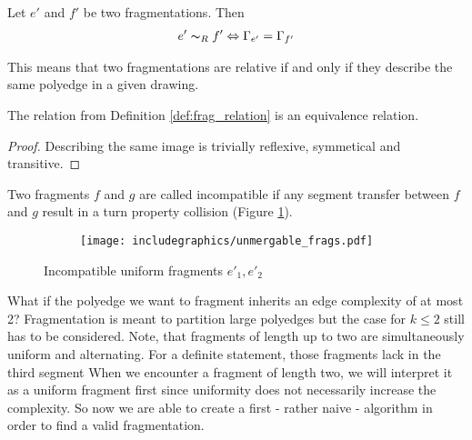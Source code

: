 \begin{definition}
	Let $e'$ and $f'$ be two fragmentations. Then 
	\begin{align*}e' \thicksim_R f' \Leftrightarrow \Gamma_{e'} = \Gamma_{f'}
	\end{align*}\label{def:frag_relation}
\end{definition}
This means that two fragmentations are relative if and only if they describe the same polyedge in a given drawing.
\begin{lemma}
	The relation from Definition \ref{def:frag_relation} is an equivalence relation.
\end{lemma}
\begin{proof}
	Describing the same image is trivially reflexive, symmetical and transitive.
\end{proof}
\begin{definition}
	Two fragments $f$ and $g$ are called incompatible if any segment transfer between $f$ and $g$ result in a turn property collision (Figure \ref{im:incompatible}).
\end{definition}
\begin{figure}[h]
	\centering
	\begin{subfigure}{0.4\textwidth}
		\centering
		\texttt{[image: includegraphics/unmergable\_frags.pdf]}
	\end{subfigure}
	\caption{Incompatible uniform fragments $e'_1,e'_2$}\label{im:incompatible}
\end{figure}
What if the polyedge we want to fragment inherits an edge complexity of at most 2? Fragmentation is meant to partition large polyedges but the case for $k\leq 2$ still has to be considered. Note, that fragments of length up to two are simultaneously uniform and alternating. For a definite statement, those fragments lack in the third segment
When we encounter a fragment of length two, we will interpret it as a uniform fragment first since uniformity does not necessarily increase the complexity. So now we are able to create a first - rather naive - algorithm in order to find a valid fragmentation.\newpage
